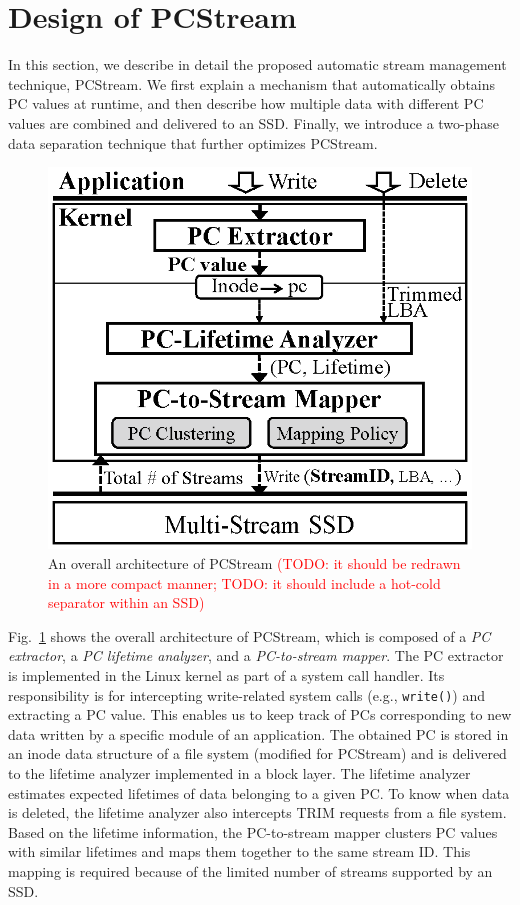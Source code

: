 \section{Design of PCStream}
In this section, we describe in detail the proposed automatic stream management
technique, {\sf PCStream}.  We first explain a mechanism that automatically
obtains PC values at runtime, and then describe how multiple data with
different PC values are combined and delivered to an SSD. Finally, we introduce
a two-phase data separation technique that further optimizes {\sf PCStream}.

\begin{figure}[t]
	\centering
	\includegraphics[width=0.6\linewidth]{figure/architecture4}
	\vspace{-10pt}
	\caption{An overall architecture of {\sf PCStream} 
	\textcolor{red}{(TODO: it should be redrawn in a more compact manner;
	TODO: it should include a hot-cold separator within an SSD)}
	}
	\label{fig:architecture}
	\vspace{-10pt}
\end{figure}

Fig.~\ref{fig:architecture} shows the overall architecture of {\sf PCStream},
which is composed of a \textit{PC extractor}, a \textit{PC lifetime analyzer},
and a \textit{PC-to-stream mapper}.  The PC extractor is implemented in the
Linux kernel as part of a system call handler. Its responsibility is for
intercepting write-related system calls (e.g., \texttt{write()}) and extracting
a PC value.  This enables us to keep track of PCs corresponding to new data
written by a specific module of an application.  The obtained PC is stored in
an inode data structure of a file system (modified for \textsf{PCStream}) and
is delivered to the lifetime analyzer implemented in a block layer.  The
lifetime analyzer estimates expected lifetimes of data belonging to a given PC.
To know when data is deleted, the lifetime analyzer also intercepts TRIM
requests from a file system.  Based on the lifetime information, the
PC-to-stream mapper clusters PC values with similar lifetimes and maps them
together to the same stream ID.  This mapping is required because of the
limited number of streams supported by an SSD.

